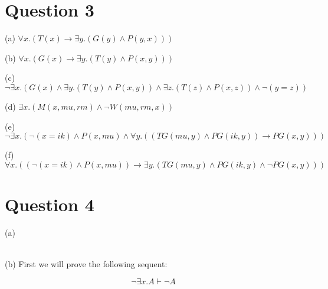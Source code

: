 \documentclass[12pt]{article}
\begin{document}
\section*{Question 3}

\noindent (a) $\forall x. (T(x) \to \exists y. (G(y) \wedge P(y, x)))$

\noindent (b) $\forall x. (G(x) \to \exists y. (T(y) \wedge P(x, y)))$

\noindent (c) $\neg \exists x. (G(x) \wedge \exists y. (T(y) \wedge P(x, y)) \wedge \exists z. (T(z) \wedge P(x, z)) \wedge \neg (y = z))$

\noindent (d) $\exists x. (M(x, mu, rm) \wedge \neg W(mu, rm, x))$

\noindent (e) $\neg \exists x. (\neg (x = ik) \wedge P(x, mu) \wedge \forall y. ((TG(mu, y) \wedge PG(ik, y)) \to PG(x, y)))$

\noindent (f) $\forall x. ((\neg (x = ik) \wedge P(x, mu)) \to \exists y. (TG(mu, y) \wedge PG(ik, y) \wedge \neg PG(x, y)))$

\section*{Question 4}

\noindent (a)

 \\

\noindent (b) First we will prove the following sequent:

$$\neg \exists x. A \vdash \neg A$$

 \\
\end{document}
